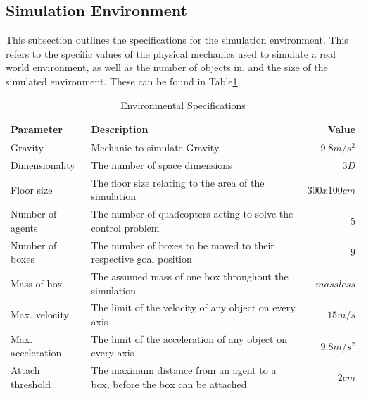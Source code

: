 \subsection{Simulation Environment}
\label{sec:environment}

This subsection outlines the specifications for the simulation environment. This refers to the specific values of the physical mechanics used to simulate a real world environment, as well as the number of objects in, and the size of the simulated environment. These can be found in Table\ref{tab:env_specs}

\begin{table}[H]
\centering
\begin{tabularx}{1\textwidth}{l@{ }Xr}
\toprule
\textbf{Parameter}   & \textbf{Description}                                                        & \textbf{Value} \\ \midrule
Gravity		       & Mechanic to simulate Gravity                                                  & ${9.8m/s^2}$  \\
Dimensionality		 & The number of space dimensions               							   & ${3D}$          \\
Floor size			 & The floor size relating to the area of the simulation				       & ${300x100cm}$          \\
Number of agents     & The number of quadcopters acting to solve the control problem               & ${5}$          \\
Number of boxes      & The number of boxes to be moved to their respective goal position           & ${9}$              \\
Mass of box          & The assumed mass of one box throughout the simulation                       & ${massless}$       \\
Max. velocity        & The limit of the velocity of any object on every axis                          & ${15m/s}$         \\
Max. acceleration    & The limit of the acceleration of any object on every axis                      & ${9.8m/s^2}$       \\
Attach threshold     & The maximum distance from an agent to a box, before the box can be attached & ${2cm}$           \\ \bottomrule
\end{tabularx}
\caption{Environmental Specifications}
\label{tab:env_specs}
\end{table}

